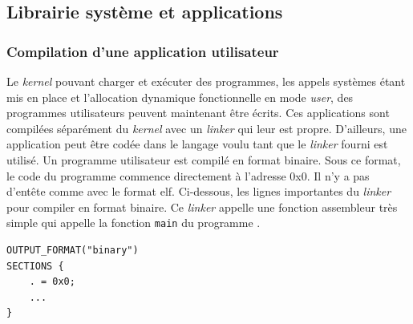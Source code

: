 \subsection{Librairie système et applications}
\subsubsection{Compilation d'une application utilisateur}
Le \textit{kernel} pouvant charger et exécuter des programmes, les appels systèmes
étant mis en place et l'allocation dynamique fonctionnelle en mode \textit{user},
des programmes utilisateurs peuvent maintenant être écrits. Ces applications
sont compilées séparément du \textit{kernel} avec un \textit{linker} qui leur
est propre. D'ailleurs, une application peut être codée dans le langage voulu
tant que le \textit{linker} fourni est utilisé. Un programme utilisateur est
compilé en format binaire. Sous ce format, le code du programme commence directement
à l'adresse 0x0. Il n'y a pas d'entête comme avec le format \acrshort{elf}.
Ci-dessous, les lignes importantes du \textit{linker} pour compiler en format
binaire. Ce \textit{linker} appelle une fonction assembleur très simple qui
appelle la fonction \texttt{main} du programme \cite{ref42}. \\

\begin{verbatim}
OUTPUT_FORMAT("binary")
SECTIONS {
    . = 0x0;
    ...
}
\end{verbatim}

